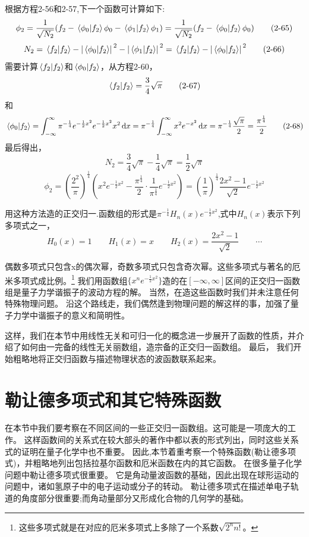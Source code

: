 根据方程2-56和2-57,下一个函数可计算如下:
\[\phi_2=\frac{1}{\sqrt{N_2}}(f_2-\bra*{\phi_0}\ket*{f_2}\phi_0-\bra*{\phi_1}\ket*{f_2}\phi_1)=\frac{1}{\sqrt{N_2}}(f_2-\bra*{\phi_0}\ket*{f_2}\phi_0) \tag{2-65}\]
\[N_2=\bra*{f_2}\ket*{f_2}-\abs*{\bra*{\phi_0}\ket*{f_2}}^2-\abs*{\bra*{\phi_1}\ket*{f_2}}^2=\bra*{f_2}\ket*{f_2}-\abs*{\bra*{\phi_0}\ket*{f_2}}^2 \tag{2-66}\]
需要计算$\bra*{f_2}\ket*{f_2}$和$\bra*{\phi_0}\ket*{f_2}$，从方程2-60，
\[\bra*{f_2}\ket*{f_2}=\frac{3}{4}\sqrt{\pi} \tag{2-67}\]
和
\[\bra*{\phi_0}\ket*{f_2}=\int_{-\infty}^{\infty}\pi^{-\frac{1}{4}}e^{-\frac{1}{2}x^2}e^{-\frac{1}{2}x^2}x^2\dd{x}=\pi^{-\frac{1}{4}}\int_{-\infty}^{\infty}x^2e^{-x^2}\dd{x}=\pi^{-\frac{1}{4}}\frac{\sqrt{\pi}}{2}=\frac{\pi^{\frac{1}{4}}}{2} \tag{2-68}\]
最后得出，
\[N_2=\frac{3}{4}\sqrt{\pi}-\frac{1}{4}\sqrt{\pi}=\frac{1}{2}\sqrt{\pi} \tag{2-69}\]
\[\phi_2=\left( \frac{2^2}{\pi}\right)^{\frac{1}{4}}\left( x^2e^{-\frac{1}{2}x^2}-\frac{\pi^{\frac{1}{4}}}{2} \cdot \frac{1}{\pi^{\frac{1}{4}}}e^{-\frac{1}{2}x^2}\right)=\left( \frac{1}{\pi}\right )^{\frac{1}{4}}\frac{2x^2-1}{\sqrt{2}}e^{-\frac{1}{2}x^2} \tag{2-70}\]

用这种方法造的正交归一.函数组的形式是$\pi^{-\frac{1}{4}}H_n(x)e^{-\frac{1}{2}x^2}$,式中$H_n(x)$表示下列多项式之一，
\[H_0(x)=1 \qquad H_1(x)=x \qquad H_2(x)=\frac{2x^2-1}{\sqrt{2}} \qquad \cdots  \tag{2-71}\]

偶数多项式只包含x的偶次幂，奇数多项式只包含奇次幂。这些多项式与著名的厄米多项式成比例。\footnote{这些多项式就是在对应的厄米多项式上多除了一个系数$\sqrt{2^nn!}$。}
我们用函数组$\{x^ne^{-\frac{1}{2}x^2}\}$造的在$[-\infty,\infty]$区间的正交归一函数组是量子力学谐振子的波动方程的解。
当然，在造这些函数时我们并未注意任何特殊物理问题。
沿这个路线走，我们偶然逢到物理问题的解这样的事，加强了量子力学中谐振子的意义和简明性。

这样，我们在本节中用线性无关和可归一化的概念进一步展开了函数的性质，并介绍了如何由一完备的线性无关丽数组，造宗备的正交归一函数组。
最后， 我们开始粗略地将正交归函数与描述物理状态的波函数联系起来。

\section{勒让德多项式和其它特殊函数}

在本节中我们要考察在不同区间的一些正交归一函数组。这可能是一项庞大的工作。
这样函数间的关系式在较大部头的著作中都以表的形式列出，同时这些关系式的证明在量子化学中也不重要。
因此,本节着重考察一个特殊函数(勒让德多项式)，并粗略地列出包括拉基尔函数和厄米函数在内的其它函数。
在很多量子化学问题中勒让德多项式很重要。
它是角动量波函数的基础，因此出现在球形运动的问题中，诸如氢原子中的电子运动或分子的转动。
勒让德多项式在描述单电子轨道的角度部分很重要;而角动量部分又形成化合物的几何学的基础。

